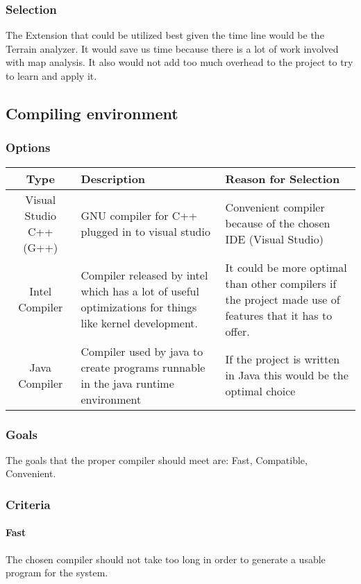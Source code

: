 \documentclass[10pt,letterpaper,onecolumn,draftclsnofoot]{IEEEtran}
\begin{document}
\subsubsection{Selection}
The Extension that could be utilized best given the time line would be the Terrain analyzer. It would save us time because there is a lot of work involved with map analysis. It also would not add too much overhead to the project to try to learn and apply it.

\subsection{Compiling environment}
\subsubsection{Options}
\begin{center}
	\begin{tabular}{ ||C|L|L|| } 
		\hline
		Type & Description & Reason for Selection \\
		\hline
		Visual Studio C++ (G++) & GNU compiler for C++ plugged in to visual studio & Convenient compiler because of the chosen IDE (Visual Studio) \\ 
		\hline
		Intel Compiler & Compiler released by intel which has a lot of useful optimizations for things like kernel development. & It could be more optimal than other compilers if the project made use of features that it has to offer. \\ 
		\hline
		Java Compiler & Compiler used by java to create programs runnable in the java runtime environment & If the project is written in Java this would be the optimal choice \\ 
		\hline
	\end{tabular}
\end{center}
\subsubsection{Goals}
The goals that the proper compiler should meet are: Fast, Compatible, Convenient.
\subsubsection{Criteria}
\paragraph{Fast}
The chosen compiler should not take too long in order to generate a usable program for the system.
\end{document}

